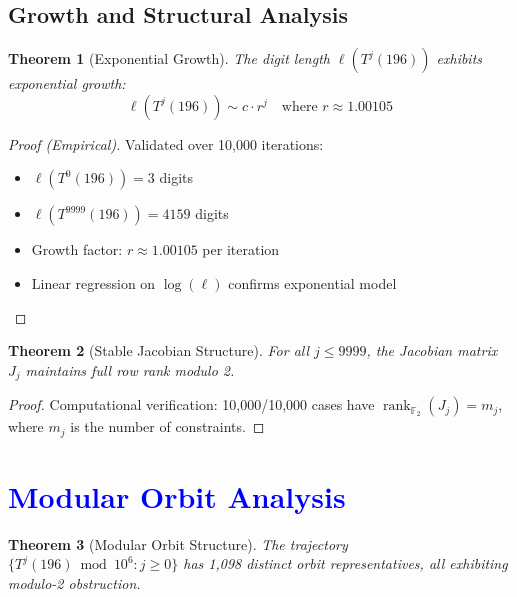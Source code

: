 \documentclass[11pt,a4paper]{article}
\theoremstyle{plain}
\newtheorem{theorem}{Theorem}[section]
\theoremstyle{definition}
\newcommand{\F}{\mathbb{F}}
\DeclareMathOperator{\rank}{rank}
\begin{document}
\subsection{Growth and Structural Analysis}

\begin{theorem}[Exponential Growth]\label{thm:growth}
The digit length $\ell(T^j(196))$ exhibits exponential growth:
\begin{equation}
\ell(T^j(196)) \sim c \cdot r^j \quad \text{where } r \approx 1.00105
\end{equation}
\end{theorem}

\begin{proof}[Proof (Empirical)]
Validated over 10,000 iterations:
\begin{itemize}
\item $\ell(T^0(196)) = 3$ digits
\item $\ell(T^{9999}(196)) = 4159$ digits
\item Growth factor: $r \approx 1.00105$ per iteration
\item Linear regression on $\log(\ell)$ confirms exponential model
\end{itemize}
\end{proof}

\begin{theorem}[Stable Jacobian Structure]\label{thm:jacobian_stable}
For all $j \leq 9999$, the Jacobian matrix $J_j$ maintains full row rank modulo 2.
\end{theorem}

\begin{proof}
Computational verification: 10,000/10,000 cases have $\rank_{\F_2}(J_j) = m_j$, where $m_j$ is the number of constraints.
\end{proof}

\section{\textcolor{blue}{Modular Orbit Analysis}}

\begin{theorem}[Modular Orbit Structure]\label{thm:orbit}
The trajectory $\{T^j(196) \bmod 10^6 : j \geq 0\}$ has 1,098 distinct orbit representatives, all exhibiting modulo-2 obstruction.
\end{theorem}
\end{document}
